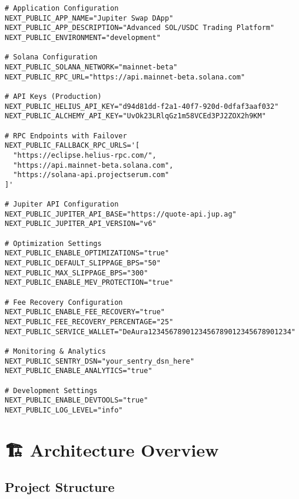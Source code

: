 \documentclass[11pt,a4paper]{article}
\begin{document}
\begin{lstlisting}[style=typescript, caption=Environment Variables (.env.local)]
# Application Configuration
NEXT_PUBLIC_APP_NAME="Jupiter Swap DApp"
NEXT_PUBLIC_APP_DESCRIPTION="Advanced SOL/USDC Trading Platform"
NEXT_PUBLIC_ENVIRONMENT="development"

# Solana Configuration
NEXT_PUBLIC_SOLANA_NETWORK="mainnet-beta"
NEXT_PUBLIC_RPC_URL="https://api.mainnet-beta.solana.com"

# API Keys (Production)
NEXT_PUBLIC_HELIUS_API_KEY="d94d81dd-f2a1-40f7-920d-0dfaf3aaf032"
NEXT_PUBLIC_ALCHEMY_API_KEY="UvOk23LRlqGz1m58VCEd3PJ2ZOX2h9KM"

# RPC Endpoints with Failover
NEXT_PUBLIC_FALLBACK_RPC_URLS='[
  "https://eclipse.helius-rpc.com/",
  "https://api.mainnet-beta.solana.com",
  "https://solana-api.projectserum.com"
]'

# Jupiter API Configuration
NEXT_PUBLIC_JUPITER_API_BASE="https://quote-api.jup.ag"
NEXT_PUBLIC_JUPITER_API_VERSION="v6"

# Optimization Settings
NEXT_PUBLIC_ENABLE_OPTIMIZATIONS="true"
NEXT_PUBLIC_DEFAULT_SLIPPAGE_BPS="50"
NEXT_PUBLIC_MAX_SLIPPAGE_BPS="300"
NEXT_PUBLIC_ENABLE_MEV_PROTECTION="true"

# Fee Recovery Configuration
NEXT_PUBLIC_ENABLE_FEE_RECOVERY="true"
NEXT_PUBLIC_FEE_RECOVERY_PERCENTAGE="25"
NEXT_PUBLIC_SERVICE_WALLET="DeAura1234567890123456789012345678901234"

# Monitoring & Analytics
NEXT_PUBLIC_SENTRY_DSN="your_sentry_dsn_here"
NEXT_PUBLIC_ENABLE_ANALYTICS="true"

# Development Settings
NEXT_PUBLIC_ENABLE_DEVTOOLS="true"
NEXT_PUBLIC_LOG_LEVEL="info"
\end{lstlisting}

\section{🏗️ Architecture Overview}

\subsection{Project Structure}
\end{document}
